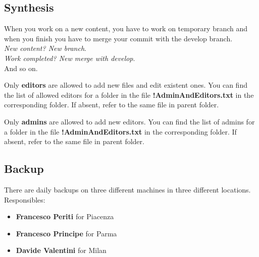 \documentclass[12pt]{article}
\begin{document}
\subsection*{Synthesis}
When you work on a new content, you have to work on temporary branch and when you finish you have to merge your commit with the develop branch.\\
\textit{New content? New branch}.\\
\textit{Work completed? New merge with develop}.\\
And so on.


Only \textbf{editors} are allowed to add new files and edit existent ones. You can find the list of allowed editors for a folder in the file \textbf{!AdminAndEditors.txt} in the corresponding folder. If absent, refer to the same file in parent folder.

Only \textbf{admins} are allowed to add new editors. You can find the list of admins for a folder in the file \textbf{!AdminAndEditors.txt} in the corresponding folder. If absent, refer to the same file in parent folder.

\subsection{Backup}
There are daily backups on three different machines in three different locations.
Responsibles:
\begin{itemize}
	\item \textbf{Francesco Periti} for Piacenza
	\item \textbf{Francesco Principe} for Parma
	\item \textbf{Davide Valentini} for Milan
\end{itemize}
\end{document}

